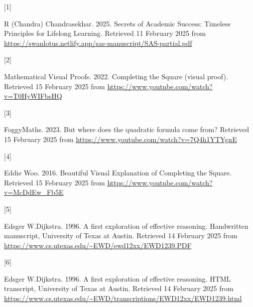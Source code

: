 \documentclass[
  a4paper,
]{article}
\newlength{\cslhangindent}
\newlength{\csllabelwidth}
\newenvironment{CSLReferences}[2] %
 {\begin{list}{}{%
  \setlength{\itemindent}{0pt}
  \setlength{\leftmargin}{0pt}
  \setlength{\parsep}{0pt}
  \ifodd #1
   \setlength{\leftmargin}{\cslhangindent}
   \setlength{\itemindent}{-1\cslhangindent}
  \fi
  \setlength{\itemsep}{#2\baselineskip}}}
 {\end{list}}
\newcommand{\CSLLeftMargin}[1]{\parbox[t]{\csllabelwidth}{\strut#1\strut}}
\newcommand{\CSLRightInline}[1]{\parbox[t]{\linewidth - \csllabelwidth}{\strut#1\strut}}
\begin{document}
\label{refs}
\begin{CSLReferences}{0}{0}
\CSLLeftMargin{{[}1{]} }%
\CSLRightInline{R (Chandra) Chandrasekhar. 2025. {Secrets of Academic
Success}: {Timeless Principles for Lifelong Learning}. Retrieved 11
February 2025 from
\url{https://swanlotus.netlify.app/sas-manuscript/SAS-partial.pdf}}

\CSLLeftMargin{{[}2{]} }%
\CSLRightInline{Mathematical Visual Proofs. 2022. {Completing the Square
(visual proof)}. Retrieved 15 February 2025 from
\url{https://www.youtube.com/watch?v=T0HyWIFbsHQ}}

\CSLLeftMargin{{[}3{]} }%
\CSLRightInline{FoggyMaths. 2023. {But where does the quadratic formula
come from?} Retrieved 15 February 2025 from
\url{https://www.youtube.com/watch?v=7Q4h1YTYgnE}}

\CSLLeftMargin{{[}4{]} }%
\CSLRightInline{Eddie Woo. 2016.{ Beautiful Visual Explanation of
Completing the Square}. Retrieved 15 February 2025 from
\url{https://www.youtube.com/watch?v=McDdEw_Fb5E}}

\CSLLeftMargin{{[}5{]} }%
\CSLRightInline{Edsger W.Dijkstra. 1996. {A first exploration of
effective reasoning}. {Handwritten manuscript, University of Texas at
Austin}. Retrieved 14 February 2025 from
\url{https://www.cs.utexas.edu/~EWD/ewd12xx/EWD1239.PDF}}

\CSLLeftMargin{{[}6{]} }%
\CSLRightInline{Edsger W.Dijkstra. 1996. {A first exploration of
effective reasoning}. {HTML transcript, University of Texas at Austin}.
Retrieved 14 February 2025 from
\url{https://www.cs.utexas.edu/~EWD/transcriptions/EWD12xx/EWD1239.html}}

\end{CSLReferences}
\end{document}
